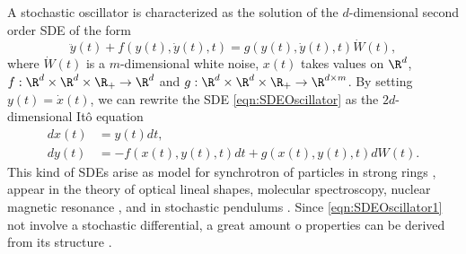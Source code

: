 	A stochastic oscillator is characterized as the solution of the $d$-dimensional second order SDE
of the form
\begin{equation}\label{eqn:SDEOscillator}
	\ddot{y}(t)+ f(y(t),\dot{y}(t), t) = g(y(t),\dot{y}(t), t) \dot{W}(t),
\end{equation}
where 
$\dot{W}(t)$ is a $m$-dimensional white noise, $x(t)$ takes values on $\R^d$,
$f:\R^d\times \R^d \times \R_{+}\to \R^d$ and
$g:\R^d\times \R^d \times \R_{+}\to \R^{d\times m}$.
By setting $y(t)=\dot{x}(t)$, we can rewrite the SDE \eqref{eqn:SDEOscillator} as the $2d$-dimensional It\^o equation
\begin{align}
	dx(t) &= y(t)dt, \label{eqn:SDEOscillator1}\\
	dy(t) &= -f(x(t),y(t),t)dt + g(x(t), y(t), t)dW(t) \label{eqn:SDEOscillator2}.
\end{align}
This kind of SDEs  arise as model for synchrotron of particles  in strong rings
\cite{Seesselberg1994}, appear in the theory of optical lineal shapes, molecular 
spectroscopy, nuclear magnetic resonance \cite{Goychuk2004}, and  in stochastic pendulums \cite{Milstein2003}.
Since \cref{eqn:SDEOscillator1} not involve a stochastic differential, a great amount o properties can be derived from
its structure \cite{Mao2007}.
